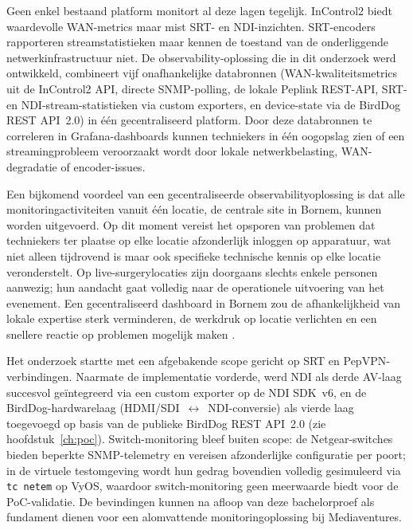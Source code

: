 Geen enkel bestaand platform monitort al deze lagen tegelijk. InControl2 biedt waardevolle WAN-metrics maar mist SRT- en NDI-inzichten. SRT-encoders rapporteren streamstatistieken maar kennen de toestand van de onderliggende netwerk\-infrastructuur niet. De observability-oplossing die in dit onderzoek werd ontwikkeld, combineert vijf onafhankelijke databronnen (WAN-kwaliteitsmetrics uit de InControl2 API, directe SNMP-polling, de lokale Peplink REST-API, SRT- en NDI-stream-statistieken via custom exporters, en device-state via de BirdDog REST API~2.0) in één gecentraliseerd platform. Door deze databronnen te correleren in Grafana-dashboards kunnen techniekers in één oogopslag zien of een streamingprobleem veroorzaakt wordt door lokale netwerkbelasting, WAN-degradatie of encoder-issues.

Een bijkomend voordeel van een gecentraliseerde observabilityoplossing is dat alle monitoringactiviteiten vanuit één locatie, de centrale site in Bornem, kunnen worden uitgevoerd. Op dit moment vereist het opsporen van problemen dat techniekers ter plaatse op elke locatie afzonderlijk inloggen op apparatuur, wat niet alleen tijdrovend is maar ook specifieke technische kennis op elke locatie veronderstelt. Op live-surgerylocaties zijn doorgaans slechts enkele personen aanwezig; hun aandacht gaat volledig naar de operationele uitvoering van het evenement. Een gecentraliseerd dashboard in Bornem zou de afhankelijkheid van lokale expertise sterk verminderen, de werkdruk op locatie verlichten en een snellere reactie op problemen mogelijk maken \autocite{VanRenterghem2025}.

Het onderzoek startte met een afgebakende scope gericht op SRT en PepVPN-verbindingen. Naarmate de implementatie vorderde, werd NDI als derde AV-laag succesvol geïntegreerd via een custom exporter op de NDI SDK~v6, en de BirdDog-hardwarelaag (HDMI/SDI~$\leftrightarrow$~NDI-conversie) als vierde laag toegevoegd op basis van de publieke BirdDog REST API~2.0 (zie hoofdstuk~\ref{ch:poc}). Switch-monitoring bleef buiten scope: de Netgear-switches bieden beperkte SNMP-telemetry en vereisen afzonderlijke configuratie per poort; in de virtuele testomgeving wordt hun gedrag bovendien volledig gesimuleerd via \texttt{tc~netem} op VyOS, waardoor switch-monitoring geen meerwaarde biedt voor de PoC-validatie. De bevindingen kunnen na afloop van deze bachelorproef als fundament dienen voor een alomvattende monitoringoplossing bij Mediaventures.

